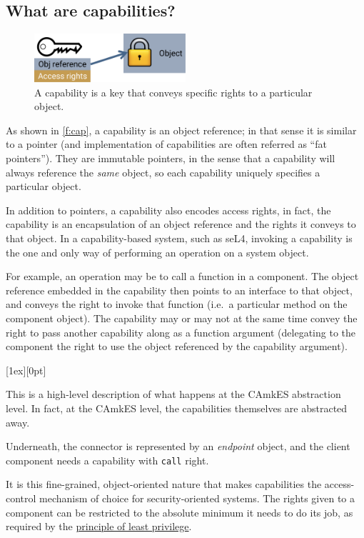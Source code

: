 \documentclass[english,a4paper,12pt\ifDraft,draft\fi]{report}
\newcommand{\SSect}[1]{\subsection{#1}}
\newcommand{\SSect}[1]{\section{#1}}
\newcommand{\code}[1]{\texttt{#1}}
\newlength{\chillilng}\setlength{\chillilng}{8mm}
\newlength{\chillimarg}\setlength{\chillimarg}{10mm}
\newcommand{\chilli}{\texttt{[image: chilli]}}
\newcommand{\chilliItem}{\raisebox{-5mm}[1ex][0pt]{%
      \makebox[\chillilng][r]{\chilli}}}
\newenvironment{Chilli}{
    \begin{list}{}{
      \setlength{\labelwidth}{\chillilng}
      \setlength{\leftmargin}{\chillimarg}}
    \item[\chilliItem]
    }
  {\end{list}}
\begin{document}
  \SSect{What are capabilities?}

  \begin{figure}[ht]
    \centering
    \includegraphics[width=0.5\textwidth]{cap}
    \caption[Capabilities are keys to objects]{A capability is a key
      that conveys specific rights to a particular object.}
    \label{f:cap}
  \end{figure}

  As shown in \autoref{f:cap}, a capability is an object reference; in
  that sense it is similar to a pointer (and implementation of
  capabilities are often referred as ``fat pointers''). They are
  immutable pointers, in the sense that a capability will always
  reference the \emph{same} object, so each capability uniquely
  specifies a particular object.

  In addition to pointers, a capability also encodes access rights, in
  fact, the capability is an encapsulation of an object reference and
  the rights it conveys to that object. In a capability-based system,
  such as seL4, invoking a capability is the one and only way of
  performing an operation on a system object.

  For example, an operation may be to call a function in a
  component. The object reference embedded in the capability then
  points to an interface to that object, and conveys the right to
  invoke that function (i.e.\ a particular method on the component
  object). The capability may or may not at the same time
  convey the right to pass another capability along as a function
  argument (delegating to the component the right to use the object
  referenced by the capability argument).

  \begin{Chilli}
    This is a high-level description of what happens at the CAmkES
    abstraction level. In fact, at the CAmkES level, the capabilities
    themselves are abstracted away.

    Underneath, the connector is represented by an
    \emph{endpoint} object, and the client component needs a
    capability with \code{call} right.
  \end{Chilli}

  It is this fine-grained, object-oriented nature that makes
  capabilities the access-control mechanism of choice for
  security-oriented systems. The rights given to a component can be
  restricted to the absolute minimum it needs to do its job, as
  required by the
  \href{https://en.wikipedia.org/wiki/Principle_of_least_privilege}{principle
    of least privilege}.
\end{document}
